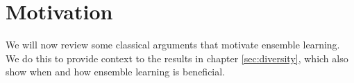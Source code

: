 \documentclass[
	twoside=false, %
]{kaobook}
\begin{document}







\section{Motivation}
\label{sec:ensemble-learning-motivation}

We will now review some classical arguments that motivate ensemble learning. We do this to provide context to the results in chapter \ref{sec:diversity}, which also show when and how ensemble learning is beneficial.
\end{document}
